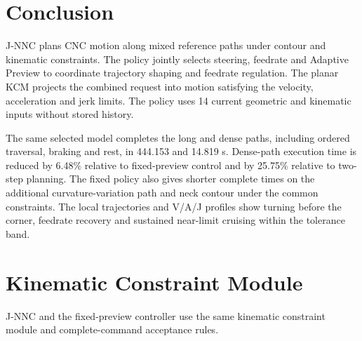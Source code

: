 \documentclass[preprint,12pt]{elsarticle}
\begin{document}

\FloatBarrier
\section{Conclusion}
\label{sec:conclusion}
J-NNC plans CNC motion along mixed reference paths under contour and kinematic constraints. The policy jointly selects steering, feedrate and Adaptive Preview to coordinate trajectory shaping and feedrate regulation. The planar KCM projects the combined request into motion satisfying the velocity, acceleration and jerk limits. The policy uses 14 current geometric and kinematic inputs without stored history.

The same selected model completes the long and dense paths, including ordered traversal, braking and rest, in 444.153{} and 14.819{} s. Dense-path execution time is reduced by 6.48\% relative to fixed-preview control and by 25.75\% relative to two-step planning. The fixed policy also gives shorter complete times on the additional curvature-variation path and neck contour under the common constraints. The local trajectories and V/A/J profiles show turning before the corner, feedrate recovery and sustained near-limit cruising within the tolerance band.

\appendix
\section{Kinematic Constraint Module}
\label{app:kcm}
J-NNC and the fixed-preview controller use the same kinematic constraint module and complete-command acceptance rules.
\end{document}

